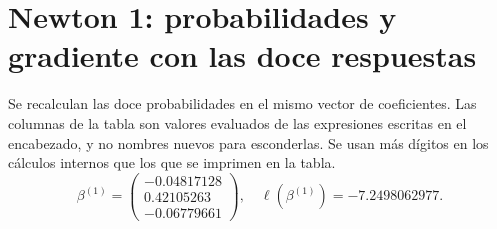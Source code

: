 \documentclass[11pt,a4paper]{article}
\begin{document}
\clearpage
\section{Newton 1: probabilidades y gradiente con las doce respuestas}\label{logit98}
Se recalculan las doce probabilidades en el mismo vector
de coeficientes. Las columnas de la tabla son valores evaluados
de las expresiones escritas en el encabezado, y no nombres nuevos
para esconderlas. Se usan más dígitos en los cálculos internos
que los que se imprimen en la tabla.
\[
\beta^{(1)}=\begin{pmatrix}-0.04817128\\0.42105263\\-0.06779661\end{pmatrix},\quad \ell(\beta^{(1)})=-7.2498062977.
\]
\end{document}
